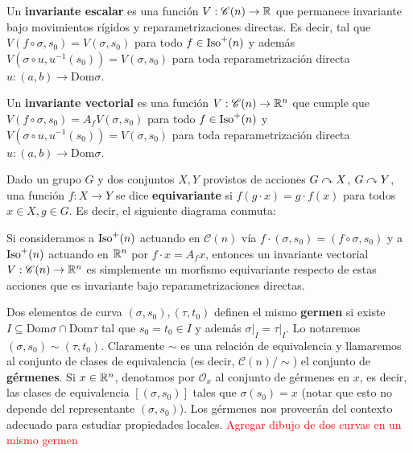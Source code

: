 \begin{defn}
Un \textbf{invariante escalar} es una función $V:\mathscr{C}(n)\to\mathbb{R}$ que permanece invariante bajo movimientos rígidos y reparametrizaciones directas. Es decir, tal que $V(f\circ\sigma,s_0) = V(\sigma,s_0)$ para todo $f\in\operatorname{Iso}^+(n)$ y además $V(\sigma\circ u,u^{-1}(s_0)) = V(\sigma,s_0)$ para toda reparametrización directa $u:(a,b)\to \mathrm{Dom}\sigma$.
\end{defn}

\begin{defn}
Un \textbf{invariante vectorial} es una función $V:\mathscr{C}(n)\to\mathbb{R}^n$ que cumple que $V(f\circ\sigma,s_0)=A_f V(\sigma,s_0)$ para todo $f\in\operatorname{Iso}^+(n)$ y $V(\sigma\circ u,u^{-1}(s_0)) = V(\sigma,s_0)$ para toda reparametrización directa $u:(a,b)\to\mathrm{Dom}\sigma$.
\end{defn}

\begin{comm}
Dado un grupo $G$ y dos conjuntos $X,Y$ provistos de acciones $G\curvearrowright X$, $G\curvearrowright Y$, una función $f:X\to Y$ se dice \textbf{equivariante} si $f(g\cdot x)=g\cdot f(x)$ para todos $x\in X,g\in G$. Es decir, el siguiente diagrama conmuta:

\begin{center}
\end{center}

Si consideramos a $\operatorname{Iso}^+(n)$ actuando en $\mathscr{C}(n)$ vía $f\cdot (\sigma,s_0) = (f\circ\sigma,s_0)$ y a $\operatorname{Iso}^+(n)$ actuando en $\mathbb{R}^n$ por $f\cdot x = A_f x$, entonces un invariante vectorial $V:\mathscr{C}(n)\to\mathbb{R}^n$ es simplemente un morfismo equivariante respecto de estas acciones que es invariante bajo reparametrizaciones directas.
\end{comm}

\begin{defn}
Dos elementos de curva $(\sigma,s_0),(\tau,t_0)$ definen el mismo \textbf{germen} si existe $I\subseteq \mathrm{Dom}\sigma\cap\mathrm{Dom}\tau$ tal que $s_0=t_0\in I$ y además $\left.\sigma\right|_{I} = \left.\tau\right|_{I}$. Lo notaremos $(\sigma,s_0)\sim (\tau,t_0)$. Claramente $\sim$ es una relación de equivalencia y llamaremos al conjunto de clases de equivalencia (es decir, $\mathscr{C}(n)/\sim$) el conjunto de \textbf{gérmenes}. Si $x\in\mathbb{R}^n$, denotamos por $\mathcal{O}_x$ al conjunto de gérmenes en $x$, es decir, las clases de equivalencia $[(\sigma,s_0)]$ tales que $\sigma(s_0)=x$ (notar que esto no depende del representante $(\sigma,s_0)$). Los gérmenes nos proveerán del contexto adecuado para estudiar propiedades locales. \textcolor{red}{Agregar dibujo de dos curvas en un mismo germen}
\end{defn}

